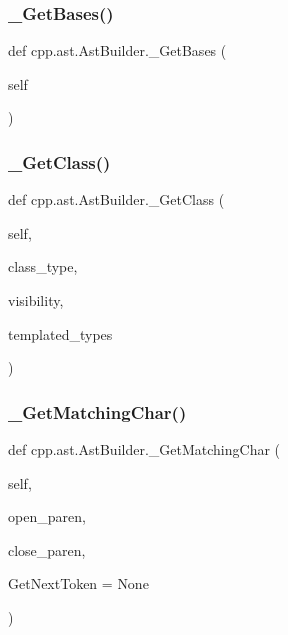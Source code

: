 \subsubsection{\texorpdfstring{\_GetBases()}{\_GetBases()}}
{\footnotesize\ttfamily def cpp.\+ast.\+Ast\+Builder.\+\_\+\+Get\+Bases (\begin{DoxyParamCaption}\item[{}]{self }\end{DoxyParamCaption})\hspace{0.3cm}{\ttfamily [private]}}

\mbox{\label{classcpp_1_1ast_1_1_ast_builder_af5670e1181b5af00bce0acc0dd9d0da7}} 
\subsubsection{\texorpdfstring{\_GetClass()}{\_GetClass()}}
{\footnotesize\ttfamily def cpp.\+ast.\+Ast\+Builder.\+\_\+\+Get\+Class (\begin{DoxyParamCaption}\item[{}]{self,  }\item[{}]{class\+\_\+type,  }\item[{}]{visibility,  }\item[{}]{templated\+\_\+types }\end{DoxyParamCaption})\hspace{0.3cm}{\ttfamily [private]}}

\mbox{\label{classcpp_1_1ast_1_1_ast_builder_a30936331903fe395451f8ed8ea2c26ba}} 
\subsubsection{\texorpdfstring{\_GetMatchingChar()}{\_GetMatchingChar()}}
{\footnotesize\ttfamily def cpp.\+ast.\+Ast\+Builder.\+\_\+\+Get\+Matching\+Char (\begin{DoxyParamCaption}\item[{}]{self,  }\item[{}]{open\+\_\+paren,  }\item[{}]{close\+\_\+paren,  }\item[{}]{Get\+Next\+Token = {\ttfamily None} }\end{DoxyParamCaption})\hspace{0.3cm}{\ttfamily [private]}}

